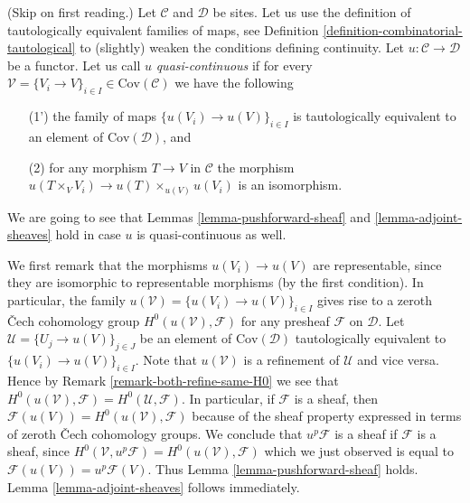 \begin{remark}
\label{remark-quasi-continuous}
(Skip on first reading.)
Let $\mathcal{C}$ and $\mathcal{D}$ be sites. Let us
use the definition of tautologically equivalent families of maps,
see Definition \ref{definition-combinatorial-tautological}
to (slightly) weaken the conditions defining continuity.
Let $u : \mathcal{C} \to \mathcal{D}$ be a functor.
Let us call $u$ {\it quasi-continuous} if for every
$\mathcal{V} = \{V_i \to V\}_{i\in I} \in \text{Cov}(\mathcal{C})$
we have the following
\begin{enumerate}
\item[(1')] the family of maps
$\{u(V_i) \to u(V)\}_{i\in I}$ is tautologically equivalent
to an element of $\text{Cov}(\mathcal{D})$, and
\item[(2)] for any morphism $T \to V$ in $\mathcal{C}$ the morphism
$u(T \times_V V_i) \to u(T) \times_{u(V)} u(V_i)$ is an isomorphism.
\end{enumerate}
We are going to see that Lemmas \ref{lemma-pushforward-sheaf}
and \ref{lemma-adjoint-sheaves} hold in case
$u$ is quasi-continuous as well.

\medskip\noindent
We first remark that the morphisms $u(V_i) \to u(V)$ are representable, since
they are isomorphic to representable morphisms (by the first condition).
In particular, the family $u(\mathcal{V}) = \{u(V_i) \to u(V)\}_{i\in I}$
gives rise to a zeroth {\v C}ech cohomology group
$H^0(u(\mathcal{V}), \mathcal{F})$ for any presheaf $\mathcal{F}$ on
$\mathcal{D}$.
Let $\mathcal{U} = \{U_j \to u(V)\}_{j \in J}$ be an element
of $\text{Cov}(\mathcal{D})$ tautologically
equivalent to $\{u(V_i) \to u(V)\}_{i \in I}$. Note that $u(\mathcal{V})$
is a refinement of $\mathcal{U}$ and vice versa. Hence by Remark
\ref{remark-both-refine-same-H0} we see that
$H^0(u(\mathcal{V}), \mathcal{F}) = H^0(\mathcal{U}, \mathcal{F})$.
In particular, if $\mathcal{F}$ is a sheaf, then
$\mathcal{F}(u(V)) = H^0(u(\mathcal{V}), \mathcal{F})$ because
of the sheaf property expressed in terms of zeroth {\v C}ech cohomology
groups. We conclude that $u^p\mathcal{F}$ is a sheaf if $\mathcal{F}$
is a sheaf, since $H^0(\mathcal{V}, u^p\mathcal{F}) =
H^0(u(\mathcal{V}), \mathcal{F})$ which we just observed is
equal to $\mathcal{F}(u(V)) = u^p\mathcal{F}(V)$. Thus Lemma
\ref{lemma-pushforward-sheaf} holds. Lemma \ref{lemma-adjoint-sheaves}
follows immediately.
\end{remark}






